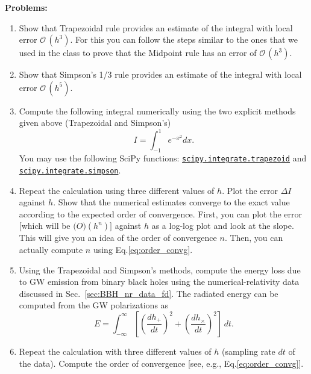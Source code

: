\textbf{Problems:}
\begin{enumerate}
\item Show that Trapezoidal rule provides an estimate of the integral with local error $ \mathcal{O}\,(h^3)$. For this you can follow the steps similar to the ones that we used in the class to prove that the Midpoint rule has an error of $ \mathcal{O}\,(h^3)$.
\item Show that Simpson's 1/3 rule provides an estimate of the integral with local error $ \mathcal{O}\,(h^5)$. 
\item Compute the following integral numerically using the two explicit methods given above (Trapezoidal and Simpson's) %
\begin{equation}
I = \int_{-1}^{1} e^{-x^2} dx.
\end{equation}
You may use the following SciPy functions: \href{https://docs.scipy.org/doc/scipy/reference/generated/scipy.integrate.trapezoid.html#scipy.integrate.trapezoid}{\texttt{scipy.integrate.trapezoid}} and \href{https://docs.scipy.org/doc/scipy/reference/generated/scipy.integrate.simpson.html#scipy.integrate.simpson}{\texttt{scipy.integrate.simpson}}.
\item Repeat the calculation using three different values of $h$. Plot the error $\Delta I$ against $h$. Show that the numerical estimates converge to the exact value according to the expected order of convergence. First, you can plot the error [which will be $\mathcal(O)(h^n)]$ against $h$ as a log-log plot and look at the slope. This will give you an idea of the order of convergence $n$. Then, you can actually compute $n$ using Eq.\eqref{eq:order_convg}.

\item Using the Trapezoidal and Simpson's methods, compute the energy loss due to GW emission from binary black holes using the numerical-relativity data discussed in Sec.~\ref{sec:BBH_nr_data_fd}. The radiated energy can be computed from the GW polarizations as 
\begin{equation}
E = \int_{-\infty}^{\infty} \left[\left(\frac{dh_+}{dt}\right)^2 +  \left(\frac{dh_\times}{dt}\right)^2 \right] \, dt. 
\end{equation}
\item Repeat the calculation with three different values of $h$ (sampling rate $dt$ of the data). Compute the order of convergence [see, e.g., Eq.\eqref{eq:order_convg}].
\end{enumerate}


